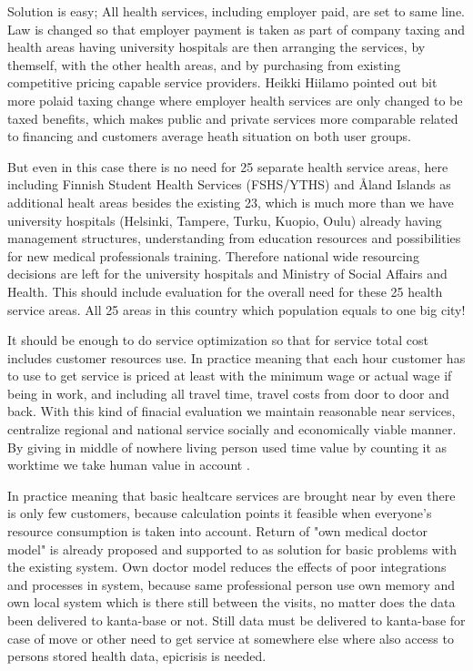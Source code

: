 Solution is easy; All health services, including employer paid, are set to
same line. Law is changed so that employer payment is taken as part of company
taxing and health areas having university hospitals are then arranging the
services, by themself, with the other health areas, and by purchasing from
existing competitive pricing capable service providers. Heikki Hiilamo
pointed out bit more polaid taxing change\allowbreak\cite{
 YleAtalk202412122106} where employer health services are only changed to be
taxed benefits, which makes public and private services more comparable
related to financing and customers average heath situation on both user
groups.

But even in this case there is no need for 25 separate health service areas,
here including Finnish Student Health Services (FSHS/YTHS) and \r{A}land
Islands as additional healt areas besides the existing 23, which is much more
than we have university hospitals (Helsinki, Tampere, Turku, Kuopio, Oulu)
already having management structures, understanding from education resources
and possibilities for new medical professionals training. Therefore national
wide resourcing decisions are left for the university hospitals and Ministry
of Social Affairs and Health. This should include evaluation for the overall
need for these 25 health service areas. All 25 areas in this country which
population equals to one big city!

It should be enough to do service optimization so that for service total cost
includes customer resources use. In practice meaning that each hour customer
has to use to get service is priced at least with the minimum wage or actual
wage if being in work, and including all travel time, travel costs from door
to door and back. With this kind of finacial evaluation we maintain reasonable
near services, centralize regional and national service socially and
economically viable manner. By giving in middle of nowhere living person used
time value by counting it as worktime we take human value in account
\cite{Yle202411251731}.

In practice meaning that basic healtcare services are brought near by even
there is only few customers, because calculation points it feasible when
everyone's resource consumption is taken into account. Return of "own medical
doctor model" is already proposed\allowbreak\cite{
 Yle202410222121}\allowbreak\cite{YleAstudio202410292107} and
supported\allowbreak\cite{Yle202411191722} to as solution for basic problems
with the existing system. Own doctor model reduces the effects of poor
integrations and processes in system, because same professional person use own
memory and own local system which is there still between the visits, no matter
does the data been delivered to kanta-base or not. Still data must be
delivered to kanta-base for case of move or other need to get service at
somewhere else where also access to persons stored health data, epicrisis is
needed.

